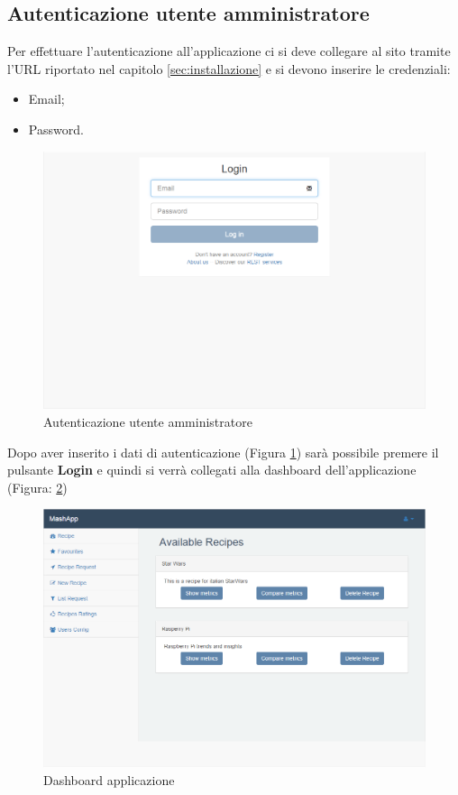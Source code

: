 		\subsection{Autenticazione utente amministratore} %
		\label{sec:autenticazione_utente}
			Per effettuare l'autenticazione\gloss{} all'applicazione ci si deve collegare al sito tramite l'URL\gloss{} riportato nel capitolo \ref{sec:installazione} e si devono inserire le credenziali:
			\begin{itemize}
				\item Email;
				\item Password.
			\end{itemize}
			\begin{figure}[H]
				\centering
				\centerline{\includegraphics[width=14cm]{images/autenticazione_utente.png}}
				\caption{Autenticazione utente amministratore}
				\label{fig:registrazione_utente_accesso}
			\end{figure}
			\pagebreak
			\noindent
			Dopo aver inserito i dati di autenticazione\gloss{} (Figura \ref{fig:registrazione_utente_accesso}) sarà possibile premere il pulsante \textbf{Login}\gloss{} e quindi si verrà collegati alla dashboard\gloss{} dell'applicazione (Figura: \ref{fig:dashboard})
			\begin{figure}[H]
				\centering
				\centerline{\includegraphics[width=19cm]{images/dashboard_amministratore.png}}
				\caption{Dashboard applicazione}
				\label{fig:dashboard}
			\end{figure}



